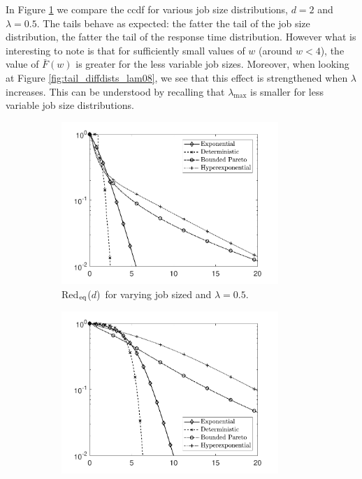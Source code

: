 \documentclass[12pt]{report}
\newcommand{\Redid}{Red$_{\textup{eq}}$($d$)}
\begin{document}
In Figure \ref{fig:tail_diffdists_lam05} we compare the ccdf for various job size distributions, $d=2$ and $\lambda=0.5$. The tails behave as expected: the fatter the tail of the job size distribution, the fatter the tail of the response time distribution. However what is interesting to note is that for sufficiently small values of $w$ (around $w<4$), the value of $\bar F(w)$ is greater for the less variable job sizes. Moreover, when looking at Figure \ref{fig:tail_diffdists_lam08}, we see that this effect is strengthened when $\lambda$ increases. This can be understood by recalling that 
$\lambda_{\max}$ is smaller for less variable job size distributions. 
\begin{figure}[t]
\begin{subfigure}{.45\textwidth}
\begin{center}
\includegraphics[width=0.9\textwidth]{figures/Chapter3/tail_diffdists_lam05.pdf}
\caption{\Redid\ for varying job sized and $\lambda=0.5$.}
\label{fig:tail_diffdists_lam05}
\end{center}
\end{subfigure}
\begin{subfigure}{.45\textwidth}
\begin{center}
\includegraphics[width=0.9\textwidth]{figures/Chapter3/tail_diffdistslam08.pdf}

\end{center}
\end{subfigure}
\end{figure}
\end{document}
